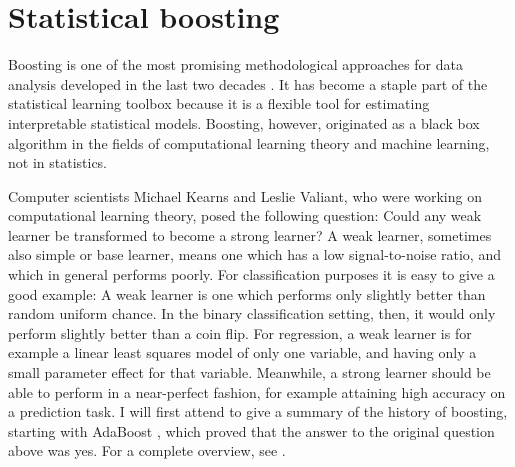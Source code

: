 \chapter{Statistical boosting}
Boosting is one of the most promising methodological approaches for data analysis developed in the last two decades \citep{mayr14a}. It has become a staple part of the statistical learning toolbox because it is a flexible tool for estimating interpretable statistical models. Boosting, however, originated as a black box algorithm in the fields of computational learning theory and machine learning, not in statistics.

Computer scientists Michael Kearns and Leslie Valiant, who were working on computational learning theory, posed the following question: Could any weak learner be transformed to become a strong learner? \citep{kearnsvaliant} A weak learner, sometimes also simple or base learner, means one which has a low signal-to-noise ratio, and which in general performs poorly. For classification purposes it is easy to give a good example: A weak learner is one which performs only slightly better than random uniform chance. In the binary classification setting, then, it would only perform slightly better than a coin flip. For regression, a weak learner is for example a linear least squares model of only one variable, and having only a small parameter effect for that variable. Meanwhile, a strong learner should be able to perform in a near-perfect fashion, for example attaining high accuracy on a prediction task. I will first attend to give a summary of the history of boosting, starting with AdaBoost \citep{adaboost}, which proved that the answer to the original question above was yes. For a complete overview, see \citet{mayr14a, mayr14b}.

